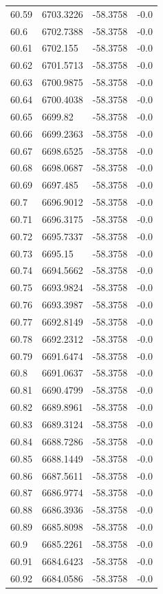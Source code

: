 \begin{table}[H]
\begin{tabular}{llll}
60.59 & 6703.3226 & -58.3758 & -0.0 \\
60.6 & 6702.7388 & -58.3758 & -0.0 \\
60.61 & 6702.155 & -58.3758 & -0.0 \\
60.62 & 6701.5713 & -58.3758 & -0.0 \\
60.63 & 6700.9875 & -58.3758 & -0.0 \\
60.64 & 6700.4038 & -58.3758 & -0.0 \\
60.65 & 6699.82 & -58.3758 & -0.0 \\
60.66 & 6699.2363 & -58.3758 & -0.0 \\
60.67 & 6698.6525 & -58.3758 & -0.0 \\
60.68 & 6698.0687 & -58.3758 & -0.0 \\
60.69 & 6697.485 & -58.3758 & -0.0 \\
60.7 & 6696.9012 & -58.3758 & -0.0 \\
60.71 & 6696.3175 & -58.3758 & -0.0 \\
60.72 & 6695.7337 & -58.3758 & -0.0 \\
60.73 & 6695.15 & -58.3758 & -0.0 \\
60.74 & 6694.5662 & -58.3758 & -0.0 \\
60.75 & 6693.9824 & -58.3758 & -0.0 \\
60.76 & 6693.3987 & -58.3758 & -0.0 \\
60.77 & 6692.8149 & -58.3758 & -0.0 \\
60.78 & 6692.2312 & -58.3758 & -0.0 \\
60.79 & 6691.6474 & -58.3758 & -0.0 \\
60.8 & 6691.0637 & -58.3758 & -0.0 \\
60.81 & 6690.4799 & -58.3758 & -0.0 \\
60.82 & 6689.8961 & -58.3758 & -0.0 \\
60.83 & 6689.3124 & -58.3758 & -0.0 \\
60.84 & 6688.7286 & -58.3758 & -0.0 \\
60.85 & 6688.1449 & -58.3758 & -0.0 \\
60.86 & 6687.5611 & -58.3758 & -0.0 \\
60.87 & 6686.9774 & -58.3758 & -0.0 \\
60.88 & 6686.3936 & -58.3758 & -0.0 \\
60.89 & 6685.8098 & -58.3758 & -0.0 \\
60.9 & 6685.2261 & -58.3758 & -0.0 \\
60.91 & 6684.6423 & -58.3758 & -0.0 \\
60.92 & 6684.0586 & -58.3758 & -0.0 \\

\end{tabular}
\end{table}
